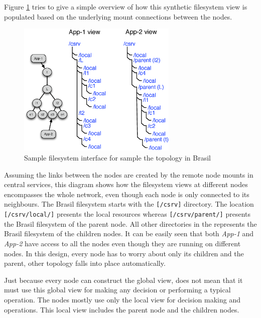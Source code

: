 Figure \ref{fig:xcpu3FSTopo} tries to give a simple overview of how this 
synthetic filesystem view is populated based on the underlying mount
connections between the nodes.

\begin{figure}[htp]
\centering
\includegraphics[width=3in]{./img/csrv-views.eps}
\caption{Sample filesystem interface for sample the topology in Brasil}
\label{fig:xcpu3FSTopo}
\end{figure}

Assuming the links between the nodes are created by the remote node mounts in
central services, this diagram shows how the filesystem views at different
nodes encompasses the whole network, even though each node is only connected to
its neighbours. The Brasil filesystem starts with the \texttt{[/csrv]}
directory. The location \texttt{[/csrv/local/]} presents the local resources
whereas \texttt{[/csrv/parent/]} presents the Brasil filesystem of the parent
node. All other directories in the represents the Brasil filesystem of the
children nodes.  It can be easily seen that both \textit{App-1} and
\textit{App-2} have access to all the nodes even though they are running on
different nodes.  In this design, every node has to worry about only its
children and the parent, other topology falls into place automatically.

Just because every node can construct the global view, does not mean that it
must use this global view for making any decision or performing a typical
operation. The nodes mostly use only the local view for decision making and
operations. This local view includes the parent node and the children nodes.


